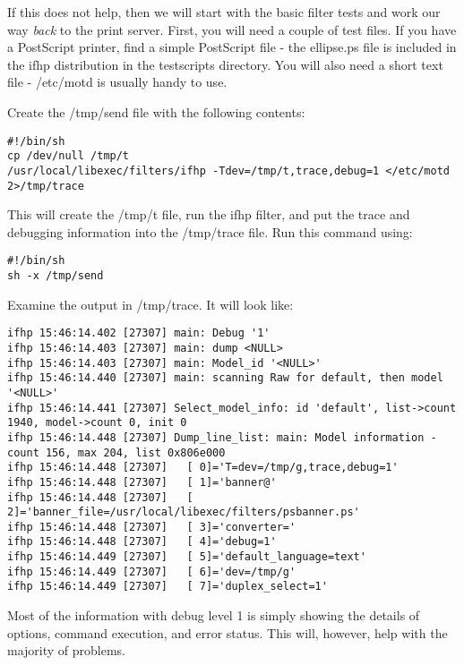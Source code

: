 \documentclass[a4paper]{article}
\begin{document}
If this does not help,
then we will start with the basic filter tests and work our way
{\itshape back\/} to the print server.
First,  you will need a couple of test files.
If you have a PostScript printer,
find a simple PostScript file - the {\ttfamily ellipse.ps}
file is included in the {\ttfamily ifhp} distribution in the
{\ttfamily testscripts} directory.
You will also need a short text file - {\ttfamily /etc/motd}
is usually handy to use.

Create the {\ttfamily /tmp/send} file with the following contents:
\begin{tscreen}
\begin{verbatim}
#!/bin/sh
cp /dev/null /tmp/t
/usr/local/libexec/filters/ifhp -Tdev=/tmp/t,trace,debug=1 </etc/motd 2>/tmp/trace
\end{verbatim}
\end{tscreen}


This will create the {\ttfamily /tmp/t} file,
run the {\ttfamily ifhp} filter,
and put the trace and debugging information into the {\ttfamily /tmp/trace}
file.
Run this command using:
\begin{tscreen}
\begin{verbatim}
#!/bin/sh
sh -x /tmp/send
\end{verbatim}
\end{tscreen}


Examine the output in {\ttfamily /tmp/trace}.
It will look like:
\begin{tscreen}
\begin{verbatim}
ifhp 15:46:14.402 [27307] main: Debug '1'
ifhp 15:46:14.403 [27307] main: dump <NULL>
ifhp 15:46:14.403 [27307] main: Model_id '<NULL>'
ifhp 15:46:14.440 [27307] main: scanning Raw for default, then model '<NULL>'
ifhp 15:46:14.441 [27307] Select_model_info: id 'default', list->count 1940, model->count 0, init 0
ifhp 15:46:14.448 [27307] Dump_line_list: main: Model information - count 156, max 204, list 0x806e000
ifhp 15:46:14.448 [27307]   [ 0]='T=dev=/tmp/g,trace,debug=1'
ifhp 15:46:14.448 [27307]   [ 1]='banner@'
ifhp 15:46:14.448 [27307]   [ 2]='banner_file=/usr/local/libexec/filters/psbanner.ps'
ifhp 15:46:14.448 [27307]   [ 3]='converter='
ifhp 15:46:14.448 [27307]   [ 4]='debug=1'
ifhp 15:46:14.449 [27307]   [ 5]='default_language=text'
ifhp 15:46:14.449 [27307]   [ 6]='dev=/tmp/g'
ifhp 15:46:14.449 [27307]   [ 7]='duplex_select=1'
\end{verbatim}
\end{tscreen}


Most of the information with debug level 1 is simply showing the details of
options,
command execution, and error status.
This will,
however,
help with the majority of problems.
\end{document}
